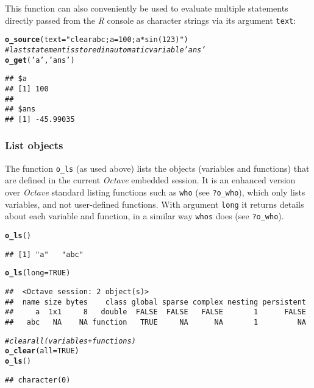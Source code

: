 \documentclass[english,10pt,a4paper]{article}\usepackage[]{graphicx}\usepackage[]{color}
\makeatletter
\newcommand{\hlnum}[1]{\textcolor[rgb]{0.686,0.059,0.569}{#1}}%
\newcommand{\hlstr}[1]{\textcolor[rgb]{0.192,0.494,0.8}{#1}}%
\newcommand{\hlcom}[1]{\textcolor[rgb]{0.678,0.584,0.686}{\textit{#1}}}%
\newcommand{\hlstd}[1]{\textcolor[rgb]{0.345,0.345,0.345}{#1}}%
\newcommand{\hlkwc}[1]{\textcolor[rgb]{0.333,0.667,0.333}{#1}}%
\newcommand{\hlkwd}[1]{\textcolor[rgb]{0.737,0.353,0.396}{\textbf{#1}}}%
\newenvironment{kframe}{%
 \def\at@end@of@kframe{}%
 \ifinner\ifhmode%
  \def\at@end@of@kframe{\end{minipage}}%
  \begin{minipage}{\columnwidth}%
 \fi\fi%
 \def\FrameCommand##1{\hskip\@totalleftmargin \hskip-\fboxsep
 \colorbox{shadecolor}{##1}\hskip-\fboxsep
     \hskip-\linewidth \hskip-\@totalleftmargin \hskip\columnwidth}%
 \MakeFramed {\advance\hsize-\width
   \@totalleftmargin\z@ \linewidth\hsize
   \@setminipage}}%
 {\par\unskip\endMakeFramed%
 \at@end@of@kframe}
\newenvironment{knitrout}{}{} %
\let\proglang=\textit
\let\code=\texttt
\newcommand{\R}{\proglang{R}\xspace}
\newcommand{\octave}{\proglang{Octave}\xspace}
\makeatother
\begin{document}
This function can also conveniently be used to evaluate multiple statements
directly passed from the \R console as character strings via its argument
\code{text}:

\begin{knitrout}
\color{fgcolor}\begin{kframe}
\begin{alltt}
\hlkwd{o_source}\hlstd{(}\hlkwc{text}\hlstd{=}\hlstr{"clear a b c; a=100; a*sin(123)"}\hlstd{)}
\hlcom{# last statement is stored in automatic variable 'ans'}
\hlkwd{o_get}\hlstd{(}\hlstr{'a'}\hlstd{,} \hlstr{'ans'}\hlstd{)}
\end{alltt}
\begin{verbatim}
## $a
## [1] 100
## 
## $ans
## [1] -45.99035
\end{verbatim}
\end{kframe}
\end{knitrout}

\subsubsection{List objects}

The function \code{o\_ls} (as used above) lists the objects (variables and
functions) that are defined in the current \octave embedded session.
It is an enhanced version over \octave standard listing functions such as
\code{who} (see \code{?o\_who}), which only lists variables, and not
user-defined functions.
With argument \code{long} it returns details about each variable and function,
in a similar way \code{whos} does (see \code{?o\_who}).

\begin{knitrout}
\color{fgcolor}\begin{kframe}
\begin{alltt}
\hlkwd{o_ls}\hlstd{()}
\end{alltt}
\begin{verbatim}
## [1] "a"   "abc"
\end{verbatim}
\begin{alltt}
\hlkwd{o_ls}\hlstd{(}\hlkwc{long}\hlstd{=}\hlnum{TRUE}\hlstd{)}
\end{alltt}
\begin{verbatim}
##  <Octave session: 2 object(s)>
##  name size bytes    class global sparse complex nesting persistent
##     a  1x1     8   double  FALSE  FALSE   FALSE       1      FALSE
##   abc   NA    NA function   TRUE     NA      NA       1         NA
\end{verbatim}
\begin{alltt}
\hlcom{#clear all (variables + functions)}
\hlkwd{o_clear}\hlstd{(}\hlkwc{all}\hlstd{=}\hlnum{TRUE}\hlstd{)}
\hlkwd{o_ls}\hlstd{()}
\end{alltt}
\begin{verbatim}
## character(0)
\end{verbatim}
\end{kframe}
\end{knitrout}
\end{document}
